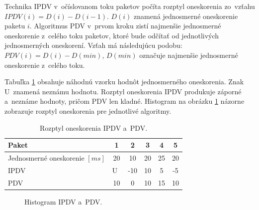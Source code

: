 Technika IPDV v~očíslovanom toku paketov počíta rozptyl oneskorenia 
zo~vzťahu \\ $IPDV(i)=D(i)-D(i-1)$. $D(i)$ znamená jednosmerné oneskorenie paketu $i$. 
Algoritmus PDV v~prvom kroku zistí najmenšie jednosmerné oneskorenie z~celého
toku paketov, ktoré bude odčítať od jednotlivých jednosmerných oneskorení. Vzťah 
má následujúcu podobu: $PDV(i)=D(i)-D(min)$, $D(min)$ označuje najmenšie
jednosmerné oneskorenie z~celého toku.

Tabuľka \ref{tab_delay_variation} obsahuje náhodnú vzorku hodnôt jednosmerného 
oneskorenia. Znak U~znamená neznámu
hodnotu. Rozptyl oneskorenia IPDV produkuje záporné a~neznáme hodnoty, pričom 
PDV len kladné. Histogram na obrázku \ref{pic_delay_histogram} názorne 
zobrazuje rozptyl oneskorenia pre jednotlivé algoritmy. 

\begin{table}[h!]
    \begin{center}
        \begin{tabular}{lccccc}
            Paket  &  1 & 2 & 3 & 4 & 5\\
            \hline
            Jednosmerné oneskorenie $[ms]$ & 20 & 10 & 20 & 25 & 20 \\
            IPDV  & U~& -10 & 10 & 5 & -5 \\
            PDV   & 10 & 0 & 10 & 15 & 10 \\
        \end{tabular}
        \caption{Rozptyl oneskorenia IPDV a~PDV.}
        \label{tab_delay_variation}
    \end{center}
\end{table}

\begin{figure}[H]
    \begin{center}
        \caption{Histogram IPDV a~PDV.}
        \label{pic_delay_histogram}
    \end{center}
\end{figure}

